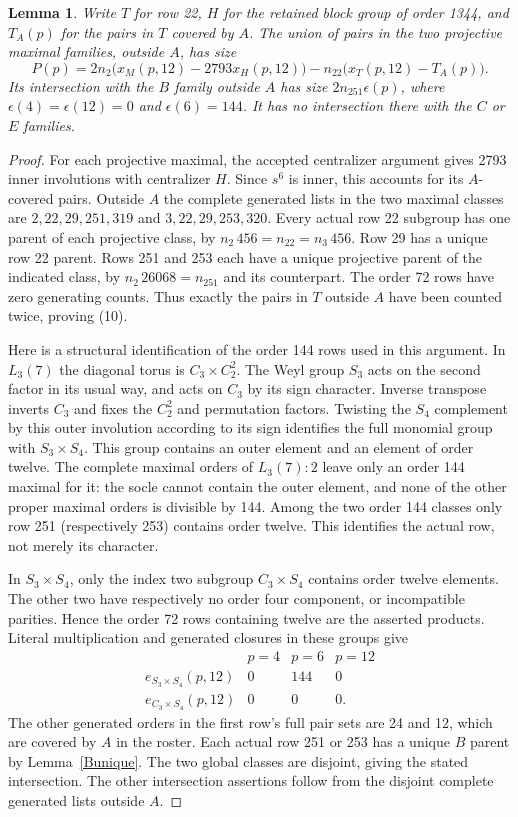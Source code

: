 \documentclass[11pt,a4paper]{article}
\newtheorem{lemma}{Lemma}\newtheorem{theorem}{Theorem}
\begin{document}
\begin{lemma}\label{projective}
Write $T$ for row 22, $H$ for the retained block group of order 1344,
and $T_A(p)$ for the pairs in $T$ covered by $A$. The union of pairs
in the two projective maximal families, outside $A$, has size
\[
 P(p)=2n_2\bigl(x_M(p,12)-2793x_H(p,12)\bigr)
                  -n_{22}\bigl(x_T(p,12)-T_A(p)\bigr).       \tag{10}
\]
Its intersection with the $B$ family outside $A$ has size
$2n_{251}\epsilon(p)$, where $\epsilon(4)=\epsilon(12)=0$ and
$\epsilon(6)=144$. It has no intersection there with the $C$ or $E$
families.
\end{lemma}
\begin{proof}
For each projective maximal, the accepted centralizer argument gives
2793 inner involutions with centralizer $H$. Since $s^6$ is inner,
this accounts for its $A$-covered pairs.
Outside $A$ the complete generated lists in the two maximal classes
are $2,22,29,251,319$ and $3,22,29,253,320$.
Every actual row 22 subgroup has one parent of each projective class,
by $n_2\,456=n_{22}=n_3\,456$. Row 29 has a unique row 22 parent.
Rows 251 and 253 each have a unique projective parent of the indicated
class, by $n_2\,26068=n_{251}$ and its counterpart. The order 72
rows have zero generating counts. Thus exactly the pairs in $T$
outside $A$ have been counted twice, proving (10).

Here is a structural identification of the order 144 rows used in
this argument. In $L_3(7)$ the diagonal torus is $C_3\times C_2^2$.
The Weyl group $S_3$ acts on the second factor in its usual way, and
acts on $C_3$ by its sign character. Inverse transpose inverts $C_3$
and fixes the $C_2^2$ and permutation factors. Twisting the $S_4$
complement by this outer involution according to its sign identifies
the full monomial group with $S_3\times S_4$.
This group contains an outer element and an element of order twelve.
The complete maximal orders of $L_3(7):2$ leave only an order 144
maximal for it: the socle cannot contain the outer element, and none
of the other proper maximal orders is divisible by 144. Among the
two order 144 classes only row 251 (respectively 253) contains order
twelve. This identifies the actual row, not merely its character.

In $S_3\times S_4$, only the index two subgroup $C_3\times S_4$
contains order twelve elements. The other two have respectively no
order four component, or incompatible parities. Hence the order 72
rows containing twelve are the asserted products. Literal multiplication
and generated closures in these groups give
\[
\begin{array}{c|rrr}
 &p=4&p=6&p=12\\\hline
 e_{S_3\times S_4}(p,12)&0&144&0\\
 e_{C_3\times S_4}(p,12)&0&0&0.
\end{array}
\]
The other generated orders in the first row's full pair sets are 24
and 12, which are covered by $A$ in the roster. Each actual row 251
or 253 has a unique $B$ parent by Lemma~\ref{Bunique}. The two global
classes are disjoint, giving the stated intersection. The other
intersection assertions follow from the disjoint complete generated
lists outside $A$.
\end{proof}
\end{document}
